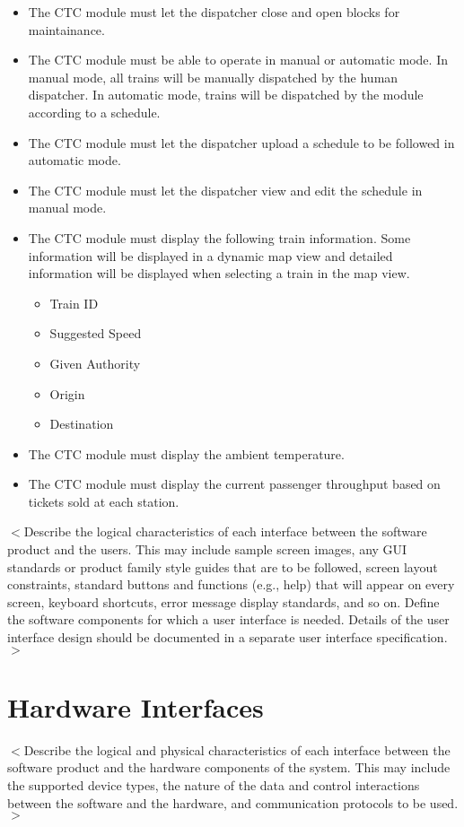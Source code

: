 \documentclass{scrreprt}
\begin{document}
\begin{itemize}
\begin{itemize}
\begin{itemize}
	\end{itemize}
  \end{itemize}
  \item The CTC module must let the dispatcher close and open blocks for maintainance.
  \item The CTC module must be able to operate in manual or automatic mode. In manual 
  mode, all trains will be manually dispatched by the human dispatcher. In automatic 
  mode, trains will be dispatched by the module according to a schedule.
  \item The CTC module must let the dispatcher upload a schedule to be followed in 
  automatic mode.
  \item The CTC module must let the dispatcher view and edit the schedule in manual mode.
  \item The CTC module must display the following train information. Some information 
  will be displayed in a dynamic map view and detailed information will be displayed 
  when selecting a train in the map view.
  \begin{itemize}
    \item Train ID
    \item Suggested Speed
    \item Given Authority
    \item Origin
    \item Destination
  \end{itemize}
  \item The CTC module must display the ambient temperature.
  \item The CTC module must display the current passenger throughput based on tickets
  sold at each station.
\end{itemize}


$<$Describe the logical characteristics of each interface between the software 
product and the users. This may include sample screen images, any GUI standards 
or product family style guides that are to be followed, screen layout 
constraints, standard buttons and functions (e.g., help) that will appear on 
every screen, keyboard shortcuts, error message display standards, and so on.  
Define the software components for which a user interface is needed. Details of 
the user interface design should be documented in a separate user interface 
specification.$>$

\section{Hardware Interfaces}
$<$Describe the logical and physical characteristics of each interface between 
the software product and the hardware components of the system. This may include 
the supported device types, the nature of the data and control interactions 
between the software and the hardware, and communication protocols to be 
used.$>$
\end{document}
